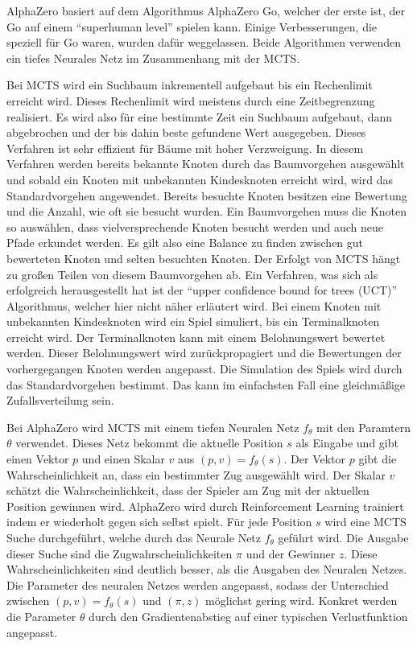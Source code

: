 AlphaZero basiert auf dem Algorithmus AlphaZero Go, welcher der erste ist, der Go auf einem \enquote{superhuman level}\cite{silver_mastering_2017-1} spielen kann. Einige Verbesserungen, die speziell für Go waren, wurden dafür weggelassen.\cite{silver_mastering_2017} Beide Algorithmen verwenden ein tiefes Neurales Netz im Zusammenhang mit der \ac{MCTS}.

Bei \ac{MCTS} wird ein Suchbaum inkrementell aufgebaut bis ein Rechenlimit erreicht wird. Dieses Rechenlimit wird meistens durch eine Zeitbegrenzung realisiert. Es wird also für eine bestimmte Zeit ein Suchbaum aufgebaut, dann abgebrochen und der bis dahin beste gefundene Wert ausgegeben. Dieses Verfahren ist sehr effizient für Bäume mit hoher Verzweigung. In diesem Verfahren werden bereits bekannte Knoten durch das Baumvorgehen ausgewählt und sobald ein Knoten mit unbekannten Kindesknoten erreicht wird, wird das Standardvorgehen angewendet. Bereits besuchte Knoten besitzen eine Bewertung und die Anzahl, wie oft sie besucht wurden. Ein Baumvorgehen muss die Knoten so auswählen, dass vielversprechende Knoten besucht werden und auch neue Pfade erkundet werden. Es gilt also eine Balance zu finden zwischen gut bewerteten Knoten und selten besuchten Knoten. Der Erfolgt von \ac{MCTS} hängt zu großen Teilen von diesem Baumvorgehen ab. Ein Verfahren, was sich als erfolgreich herausgestellt hat ist der \enquote{upper confidence bound for trees (UCT)} Algorithmus, welcher hier nicht näher erläutert wird. Bei einem Knoten mit unbekannten Kindesknoten wird ein Spiel simuliert, bis ein Terminalknoten erreicht wird. Der Terminalknoten kann mit einem Belohnungswert bewertet werden. Dieser Belohnungswert wird zurückpropagiert und die Bewertungen der vorhergegangen Knoten werden angepasst. Die Simulation des Spiels wird durch das Standardvorgehen bestimmt. Das kann im einfachsten Fall eine gleichmäßige Zufallsverteilung sein.
\cite{browne_survey_2012}

Bei AlphaZero wird \ac{MCTS} mit einem tiefen Neuralen Netz $f_\theta$ mit den Paramtern $\theta$ verwendet. Dieses Netz bekommt die aktuelle Position $s$ als Eingabe und gibt einen Vektor $p$ und einen Skalar $v$ aus $(p, v) = f_\theta(s)$. Der Vektor $p$ gibt die Wahrscheinlichkeit an, dass ein bestimmter Zug ausgewählt wird. Der Skalar $v$ schätzt die Wahrscheinlichkeit, dass der Spieler am Zug mit der aktuellen Position gewinnen wird. AlphaZero wird durch Reinforcement Learning trainiert indem er wiederholt gegen sich selbst spielt. Für jede Position $s$ wird eine \ac{MCTS} Suche durchgeführt, welche durch das Neurale Netz $f_\theta$ geführt wird. Die Ausgabe dieser Suche sind die Zugwahrscheinlichkeiten $\pi$ und der Gewinner $z$. Diese Wahrscheinlichkeiten sind deutlich besser, als die Ausgaben des Neuralen Netzes. Die Parameter des neuralen Netzes werden angepasst, sodass der Unterschied zwischen $(p, v) = f_\theta(s)$ und $(\pi, z)$ möglichst gering wird. Konkret werden die Parameter $\theta$ durch den Gradientenabstieg auf einer typischen Verlustfunktion angepasst.
\cite{silver_mastering_2017-1}\cite{silver_mastering_2017}

